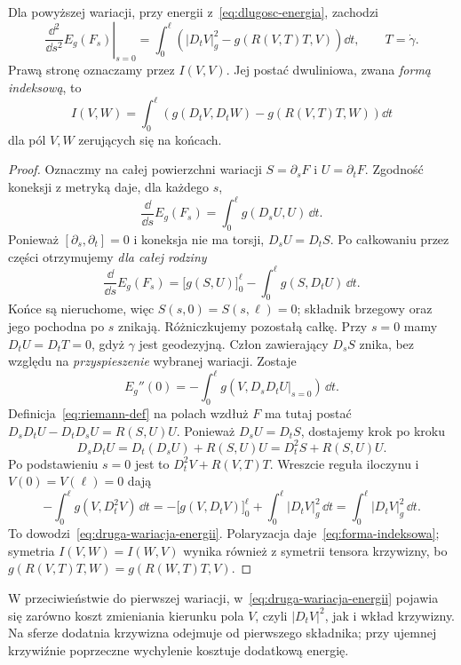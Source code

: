 \begin{twierdzenie}
\label{thm:druga-wariacja-energii}
Dla powyższej wariacji, przy energii
z~\eqref{eq:dlugosc-energia}, zachodzi
\begin{equation}\label{eq:druga-wariacja-energii}
 \left.\frac{\dd^2}{\dd s^2}E_g(F_s)\right|_{s=0}
 =\int_0^\ell\left(
   |D_tV|_g^2-g(R(V,T)T,V)\right)\dd t,
 \qquad T=\dot\gamma.
\end{equation}
Prawą stronę oznaczamy przez $I(V,V)$.
Jej postać dwuliniowa, zwana \emph{formą indeksową}, to
\begin{equation}\label{eq:forma-indeksowa}
 I(V,W)=\int_0^\ell\left(
   g(D_tV,D_tW)-g(R(V,T)T,W)\right)\dd t
\end{equation}
dla pól $V,W$ zerujących się na końcach.
\end{twierdzenie}
\begin{proof}
Oznaczmy na całej powierzchni wariacji
$S=\partial_sF$ i $U=\partial_tF$.
Zgodność koneksji z metryką daje, dla każdego $s$,
\[
 \frac{\dd}{\dd s}E_g(F_s)
 =\int_0^\ell g(D_sU,U)\,\dd t.
\]
Ponieważ $[\partial_s,\partial_t]=0$ i koneksja
nie ma torsji, $D_sU=D_tS$. Po całkowaniu
przez części otrzymujemy \emph{dla całej rodziny}
\begin{equation}\label{eq:pierwsza-wariacja-energii-kow}
 \frac{\dd}{\dd s}E_g(F_s)
 =\bigl[g(S,U)\bigr]_0^\ell
   -\int_0^\ell g(S,D_tU)\,\dd t.
\end{equation}
Końce są nieruchome, więc $S(s,0)=S(s,\ell)=0$;
składnik brzegowy oraz jego pochodna po $s$
znikają. Różniczkujemy pozostałą całkę.
Przy $s=0$ mamy $D_tU=D_tT=0$, gdyż
$\gamma$ jest geodezyjną. Człon zawierający
$D_sS$ znika, bez względu na \emph{przyspieszenie}
wybranej wariacji. Zostaje
\[
 E_g''(0)=-\int_0^\ell
         g(V,D_sD_tU|_{s=0})\,\dd t.
\]
Definicja~\eqref{eq:riemann-def} na polach
wzdłuż $F$ ma tutaj postać
$D_sD_tU-D_tD_sU=R(S,U)U$.
Ponieważ $D_sU=D_tS$, dostajemy krok po kroku
\[
 D_sD_tU=D_t(D_sU)+R(S,U)U
          =D_t^2S+R(S,U)U.
\]
Po podstawieniu $s=0$ jest to
$D_t^2V+R(V,T)T$. Wreszcie reguła iloczynu
i $V(0)=V(\ell)=0$ dają
\[
 -\int_0^\ell g(V,D_t^2V)\,\dd t
 =-\bigl[g(V,D_tV)\bigr]_0^\ell
  +\int_0^\ell|D_tV|_g^2\,\dd t
 =\int_0^\ell|D_tV|_g^2\,\dd t.
\]
To dowodzi~\eqref{eq:druga-wariacja-energii}.
Polaryzacja daje~\eqref{eq:forma-indeksowa};
symetria $I(V,W)=I(W,V)$ wynika również
z symetrii tensora krzywizny, bo
$g(R(V,T)T,W)=g(R(W,T)T,V)$.
\end{proof}

W przeciwieństwie do pierwszej wariacji,
w~\eqref{eq:druga-wariacja-energii} pojawia się
zarówno koszt zmieniania kierunku pola $V$,
czyli $|D_tV|^2$, jak i wkład krzywizny.
Na sferze dodatnia krzywizna odejmuje od
pierwszego składnika; przy ujemnej krzywiźnie
poprzeczne wychylenie kosztuje dodatkową energię.

